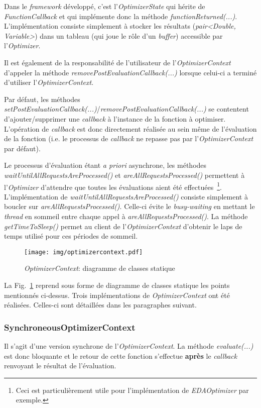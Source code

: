 \documentclass[a4paper, 12pt]{report}
\begin{document}
Dans le \textit{framework} développé, c'est l'\textit{OptimizerState} qui hérite de \textit{FunctionCallback} et qui implémente donc la méthode \textit{functionReturned(...)}. L'implémentation consiste simplement à stocker les résultats (\textit{pair<Double, Variable>}) dans un tableau (qui joue le rôle d'un \textit{buffer}) accessible par l'\textit{Optimizer}.

Il est également de la responsabilité de l'utilisateur de l'\textit{OptimizerContext} d'appeler la méthode \textit{removePostEvaluationCallback(...)} lorsque celui-ci a terminé d'utiliser l'\textit{OptimizerContext}.

Par défaut, les méthodes \textit{setPostEvaluationCallback(...)}/\textit{removePostEvaluationCallback(...)} se contentent d'ajouter/supprimer une \textit{callback} à l'instance de la fonction à optimiser. L'opération de \textit{callback} est donc directement réalisée au sein même de l'évaluation de la fonction (i.e. le processus de \textit{callback} ne repasse pas par l'\textit{OptimizerContext} par défaut).

Le processus d'évaluation étant \textit{a priori} asynchrone, les méthodes \textit{waitUntilAllRequestsAreProcessed()} et \textit{areAllRequestsProcessed()} permettent à l'\textit{Optimizer} d'attendre que toutes les évaluations aient été effectuées~\footnote{Ceci est particulièrement utile pour l'implémentation de \textit{EDAOptimizer} par exemple.}. L'implémentation de \textit{waitUntilAllRequestsAreProcessed()} consiste simplement à boucler sur \textit{areAllRequestsProcessed()}. Celle-ci évite le \textit{busy-waiting} en mettant le \textit{thread} en sommeil entre chaque appel à \textit{areAllRequestsProcessed()}. La méthode \textit{getTimeToSleep()} permet au client de l'\textit{OptimizerContext} d'obtenir le laps de temps utilisé pour ces périodes de sommeil.

\begin{figure}[!p]
\centering
\texttt{[image: img/optimizercontext.pdf]}
\caption{\textit{OptimizerContext}: diagramme de classes statique}
\label{optimizercontext}
\end{figure}

La Fig.~\ref{optimizercontext} reprend sous forme de diagramme de classes statique les points mentionnés ci-dessus. Trois implémentations de \textit{OptimizerContext} ont été réalisées. Celles-ci sont détaillées dans les paragraphes suivant.

\subsubsection{SynchroneousOptimizerContext} 
Il s'agit d'une version synchrone de l'\textit{OptimizerContext}. La méthode \textit{evaluate(...)} est donc bloquante et le retour de cette fonction s'effectue \textbf{après} le \textit{callback} renvoyant le résultat de l'évaluation.
\end{document}
